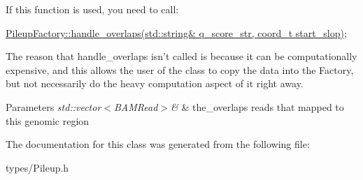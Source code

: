 If this function is used, you need to call:

\hyperlink{class_pileup_factory_abfb03a6dad3dbc9d7216c2d96174b42f}{PileupFactory::handle\_\-overlaps(std::string\& q\_\-score\_\-str, coord\_\-t start\_\-slop)};

The reason that handle\_\-overlaps isn't called is because it can be computationally expensive, and this allows the user of the class to copy the data into the Factory, but not necessarily do the heavy computation aspect of it right away.


\begin{DoxyParams}{Parameters}
{\em std::vector$<$BAMRead$>$\&} & the\_\-overlaps reads that mapped to this genomic region \\
\hline
\end{DoxyParams}


The documentation for this class was generated from the following file:\begin{DoxyCompactItemize}
\item 
types/Pileup.h\end{DoxyCompactItemize}
